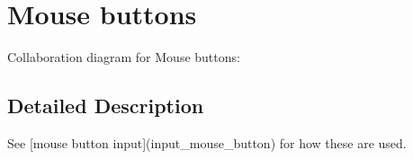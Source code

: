 \hypertarget{group__buttons}{
\section{Mouse buttons}
\label{group__buttons}
}


Collaboration diagram for Mouse buttons:

\subsection{Detailed Description}
See \mbox{[}mouse button input\mbox{]}(input\_\-mouse\_\-button) for how these are used. 